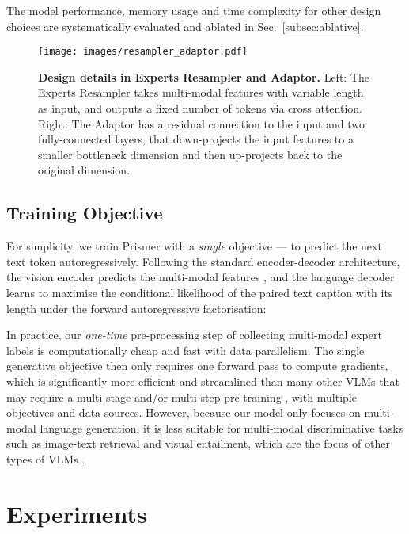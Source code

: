 \documentclass[11pt]{article}
\begin{document}
{The model performance, memory usage and time complexity for other design choices are systematically evaluated and ablated in Sec.~\ref{subsec:ablative}.

\begin{figure}[t!]
  \centering
  \texttt{[image: images/resampler\_adaptor.pdf]}
  \caption{{\bf Design details in Experts Resampler and Adaptor.} Left: The Experts Resampler takes multi-modal features with variable length as input, and outputs a fixed number of tokens via cross attention. Right: The Adaptor has a residual connection to the input and two fully-connected layers, that down-projects the input features to a smaller bottleneck dimension and then up-projects back to the original dimension.}
  \label{fig:resampler_adaptor}  
\end{figure}

\subsection{Training Objective}
For simplicity, we train Prismer with a {\it single} objective --- to predict the next text token autoregressively. Following the standard encoder-decoder architecture, the vision encoder predicts the multi-modal features , and the language decoder learns to maximise the conditional likelihood of the paired text caption  with its length  under the forward autoregressive factorisation: 

In practice, our {\it one-time} pre-processing step of collecting multi-modal expert labels is computationally cheap and fast with data parallelism. The single generative objective then only requires one forward pass to compute gradients, which is significantly more efficient and streamlined than many other VLMs that may require a multi-stage and/or multi-step pre-training \cite{li2022blip,li2021albef,wang2022ofa,dou2022meter,chen2020uniter}, with multiple objectives and data sources. However, because our model only focuses on multi-modal language generation, it is less suitable for multi-modal discriminative tasks such as image-text retrieval and visual entailment, which are the focus of other types of VLMs  \cite{gan2020villa,chen2020uniter,jia2021align}.



\section{Experiments}

}
\end{document}
